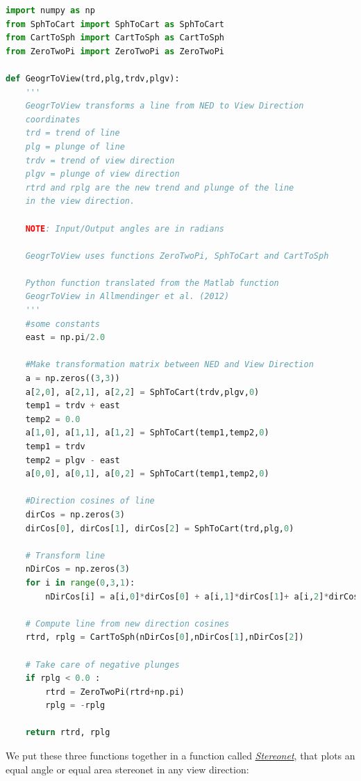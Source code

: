 \documentclass[a4paper , 12pt]{book}
\begin{document}
\begin{lstlisting}[language=Python, frame=single]
import numpy as np
from SphToCart import SphToCart as SphToCart
from CartToSph import CartToSph as CartToSph
from ZeroTwoPi import ZeroTwoPi as ZeroTwoPi

def GeogrToView(trd,plg,trdv,plgv):
    '''
	GeogrToView transforms a line from NED to View Direction
	coordinates
	trd = trend of line
   	plg = plunge of line 
   	trdv = trend of view direction 
   	plgv = plunge of view direction 
   	rtrd and rplg are the new trend and plunge of the line 
   	in the view direction.

   	NOTE: Input/Output angles are in radians

   	GeogrToView uses functions ZeroTwoPi, SphToCart and CartToSph

   	Python function translated from the Matlab function 
   	GeogrToView in Allmendinger et al. (2012)
	'''
    #some constants 
    east = np.pi/2.0
    
    #Make transformation matrix between NED and View Direction
    a = np.zeros((3,3))
    a[2,0], a[2,1], a[2,2] = SphToCart(trdv,plgv,0)
    temp1 = trdv + east
    temp2 = 0.0
    a[1,0], a[1,1], a[1,2] = SphToCart(temp1,temp2,0)
    temp1 = trdv
    temp2 = plgv - east
    a[0,0], a[0,1], a[0,2] = SphToCart(temp1,temp2,0)
     
    #Direction cosines of line
    dirCos = np.zeros(3)
    dirCos[0], dirCos[1], dirCos[2] = SphToCart(trd,plg,0)
      
    # Transform line
    nDirCos = np.zeros(3)
    for i in range(0,3,1):
        nDirCos[i] = a[i,0]*dirCos[0] + a[i,1]*dirCos[1]+ a[i,2]*dirCos[2]
    
    # Compute line from new direction cosines
    rtrd, rplg = CartToSph(nDirCos[0],nDirCos[1],nDirCos[2])
    
    # Take care of negative plunges
    if rplg < 0.0 :
        rtrd = ZeroTwoPi(rtrd+np.pi)
        rplg = -rplg
    
    return rtrd, rplg
\end{lstlisting}

We put these three functions together in a function called \href{https://github.com/nfcd/compGeo/blob/master/source/functions/Stereonet.py}{\textit{Stereonet}}, that plots an equal angle or equal area stereonet in any view direction:
\end{document}
